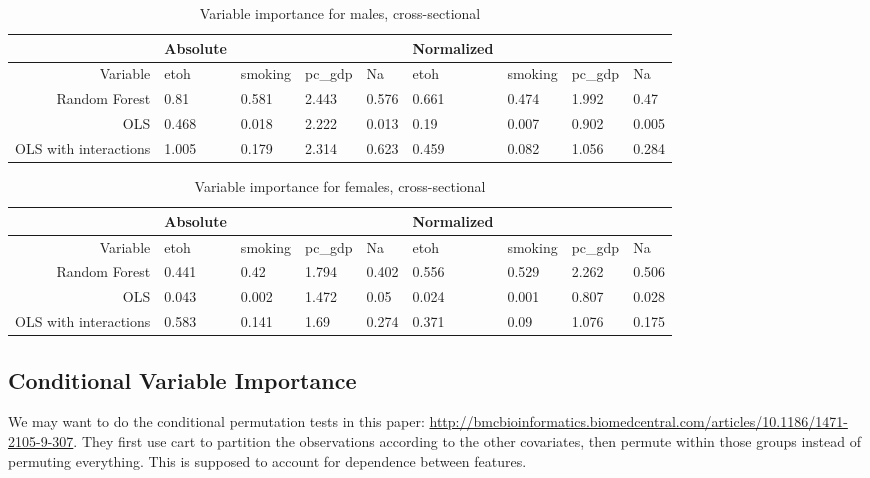 \documentclass[11pt]{article}\usepackage[]{graphicx}\usepackage[]{color}
\begin{document}
\begin{table}[ht]
\centering
\begin{tabular}{r|llll|llll}
   \hline
 & Absolute &  &  &  & Normalized &  &  &  \\ 
   \hline
Variable & etoh & smoking & pc\_gdp & Na & etoh & smoking & pc\_gdp & Na \\ 
  Random Forest & 0.81 & 0.581 & 2.443 & 0.576 & 0.661 & 0.474 & 1.992 & 0.47 \\ 
  OLS & 0.468 & 0.018 & 2.222 & 0.013 & 0.19 & 0.007 & 0.902 & 0.005 \\ 
  OLS with interactions & 1.005 & 0.179 & 2.314 & 0.623 & 0.459 & 0.082 & 1.056 & 0.284 \\ 
   \hline
\end{tabular}
\caption{Variable importance for males, cross-sectional} 
\end{table}
\begin{table}[ht]
\centering
\begin{tabular}{r|llll|llll}
   \hline
 & Absolute &  &  &  & Normalized &  &  &  \\ 
   \hline
Variable & etoh & smoking & pc\_gdp & Na & etoh & smoking & pc\_gdp & Na \\ 
  Random Forest & 0.441 & 0.42 & 1.794 & 0.402 & 0.556 & 0.529 & 2.262 & 0.506 \\ 
  OLS & 0.043 & 0.002 & 1.472 & 0.05 & 0.024 & 0.001 & 0.807 & 0.028 \\ 
  OLS with interactions & 0.583 & 0.141 & 1.69 & 0.274 & 0.371 & 0.09 & 1.076 & 0.175 \\ 
   \hline
\end{tabular}
\caption{Variable importance for females, cross-sectional} 
\end{table}



\subsection{Conditional Variable Importance}

We may want to do the conditional permutation tests in this paper: \url{http://bmcbioinformatics.biomedcentral.com/articles/10.1186/1471-2105-9-307}.
They first use cart to partition the observations according to the other covariates, then permute within those groups instead of permuting everything.
This is supposed to account for dependence between features.
\end{document}
